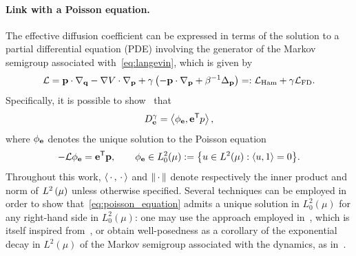 \documentclass[11pt,a4paper]{article}
\begin{document}
\paragraph{Link with a Poisson equation.}
The effective diffusion coefficient
can be expressed in terms of the solution to a partial differential equation (PDE) involving the generator of the Markov semigroup associated with~\eqref{eq:langevin},
which is given by
\begin{equation}
    \label{eq:decomposition_generator}
    \mathcal L
    = \boldsymbol{\mathbf p} \cdot \nabla_{\boldsymbol{\mathbf q}} - \nabla V \cdot \nabla_{\boldsymbol{\mathbf p}} + \gamma \left( - \boldsymbol{\mathbf p} \cdot \nabla_{\boldsymbol{\mathbf p}} + \beta^{-1} \Delta_{\boldsymbol{\mathbf p}} \right)
    =: \mathcal L_{\rm Ham} + \gamma \mathcal L_{\rm FD}.
\end{equation}
Specifically, it is possible to show~\cite{MR663900} that
\begin{equation}
    \label{eq:effective_diffusion_poisson}
    D^{\gamma}_{\vect e} = \ip{\phi_{\vect e}}{\vect e^\t p},
\end{equation}
where $\phi_{\boldsymbol{\mathbf e}}$ denotes the unique solution to the Poisson equation
\begin{equation}
    \label{eq:poisson_equation}
    - \mathcal L \phi_{\vect e} = \vect e^\t \vect p,
    \qquad \phi_{\vect e} \in L^2_0(\mu) := \bigl\{ u \in L^2(\mu): \ip{u}{1} = 0 \bigr\}.
\end{equation}
Throughout this work,
$\ip{\dummy}{\dummy}$ and $\norm{\dummy}$ denote respectively the inner product and norm of $\lp{2}{\mu}$
unless otherwise specified.
Several techniques can be employed in order to show that~\eqref{eq:poisson_equation} admits a unique solution in $L^2_0(\mu)$
for any right-hand side in $L^2_0(\mu)$:
one may use the approach employed in~\cite[Proposition 5.1]{MR2793823},
which is itself inspired from~\cite[Lemma 2.1]{MR812349},
or obtain well-posedness as a corollary of the exponential decay in $L^2(\mu)$ of the Markov semigroup associated with the dynamics,
as in~\cite[Corollary 1]{roussel2018spectral}.
\end{document}
